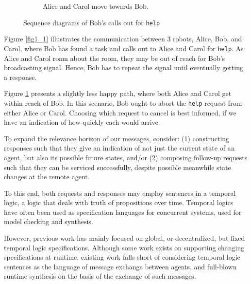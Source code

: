 \documentclass[conference]{IEEEtran}
\begin{document}
\begin{figure}
\begin{subfigure}{0.4\textwidth}
\caption{Alice and Carol move towards Bob.}
\label{fig1_2}
\end{subfigure}
\caption{Sequence diagrams of Bob's calls out for
\label{fig1}
\texttt{help}}
\end{figure}

Figure \ref{fig1_1} illustrates the communication between 3 robots,
Alice, Bob, and Carol, where Bob has found a task and calls out to
Alice and Carol for \texttt{help}. As Alice and Carol roam about the
room, they may be out of reach for Bob's broadcasting signal. Hence,
Bob has to repeat the signal until eventually getting a response.

Figure \ref{fig1_2} presents a slightly less happy path, where both
Alice and Carol get within reach of Bob. In this scenario, Bob ought
to abort the \texttt{help} request from either Alice or Carol.
Choosing which request to cancel is best informed, if we have an
indication of how quickly each would arrive.

To expand the relevance horizon of our messages, consider: (1)
constructing responses such that they give an indication of not just
the current state of an agent, but also its possible future states,
and/or (2) composing follow-up requests such that they can be serviced
successfully, despite possible meanwhile state changes at the remote
agent.

To this end, both requests and responses may employ sentences in a
temporal logic, a logic that deals with truth of propositions over
time\cite{1977-Temporal-Logic}. Temporal logics have often been used
as specification languages for concurrent systems, used for model
checking and
synthesis\cite{2021-Specification-Patterns-for-Robotic-Missions}.

However, previous work has mainly focused on global, or
decentralized\cite{2016-Multi-Agent-Planning-under-Local-LTL-Specs-and-Event-Based-Sync,
2018-Multi-robot-LTL-Planning-Under-Uncertainty}, but fixed temporal
logic specifications. Although some work exists on supporting changing
specifications at runtime\cite{2022-Live-Synthesis}, existing work
falls short of considering temporal logic sentences as the language of
message exchange between agents, and full-blown runtime synthesis on
the basis of the exchange of such messages.
\end{document}
